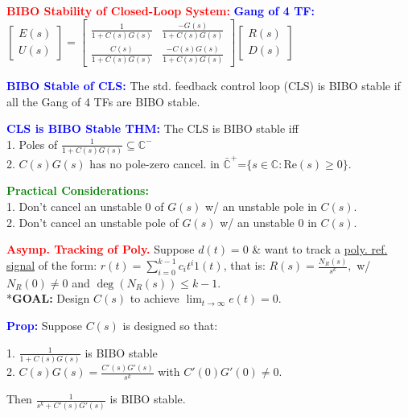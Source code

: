 \documentclass[5pt]{extarticle} %
\begin{document}
\begin{paracol}{3}
{    \textcolor{red}{\textbf{BIBO Stability of Closed-Loop System:}} \textcolor{blue}{\textbf{Gang of 4 TF:}} \\
    $\begin{bmatrix}
        E(s) \\
        U(s)
    \end{bmatrix} =
    \begin{bmatrix}
        \frac{1}{1+C(s)G(s)} & \frac{-G(s)}{1+C(s)G(s)} \\
        \frac{C(s)}{1+C(s)G(s)} & \frac{-C(s)G(s)}{1+C(s)G(s)}
    \end{bmatrix} 
    \begin{bmatrix}
        R(s) \\
        D(s)
    \end{bmatrix}
    $ 

    \textcolor{blue}{\textbf{BIBO Stable of CLS:}} The std. feedback control loop (CLS) is BIBO stable if all the Gang of 4 TFs are BIBO stable.

    \textcolor{blue}{\textbf{CLS is BIBO Stable THM:}} The CLS is BIBO stable iff \\ 
    1. Poles of $\frac{1}{1 + C(s)G(s)} \subseteq \mathbb{C}^{-}$ \\
    2. $C(s)G(s)$ has no pole-zero cancel. in $\bar{\mathbb{C}}^{+} \text{=} \{ s \in \mathbb{C} : \text{Re}(s) \geq 0 \}$. 

    \textcolor{green}{\textbf{Practical Considerations:}} \\
    1. Don't cancel an unstable 0 of $G(s)$ w/ an unstable pole in $C(s)$. \\
    2. Don't cancel an unstable pole of $G(s)$ w/ an unstable 0 in $C(s)$. 

    \textcolor{red}{\textbf{Asymp. Tracking of Poly.}} Suppose $d(t) = 0$ \& want to track a \underline{poly. ref. signal} of the form:  
    $r(t) = \sum_{i=0}^{k-1} c_i t^i 1(t)$, that is: $R(s) = \frac{N_R(s)}{s^k},$ w/ $N_R(0) \neq 0$ and $\deg(N_R(s)) \leq k-1.$  \\
    *\textbf{GOAL:} Design $C(s)$ to achieve $\lim_{t \to \infty} e(t) = 0.$ 

    \textcolor{blue}{\textbf{Prop:}} Suppose $C(s)$ is designed so that:

    1. $\frac{1}{1 + C(s) G(s)}$ is BIBO stable \\
    2. $C(s) G(s) = \frac{C'(s) G'(s)}{s^k}$ with $C'(0) G'(0) \neq 0$.

    Then $\frac{1}{s^k + C'(s) G'(s)}$ is BIBO stable.

}
\end{paracol}
\end{document}
